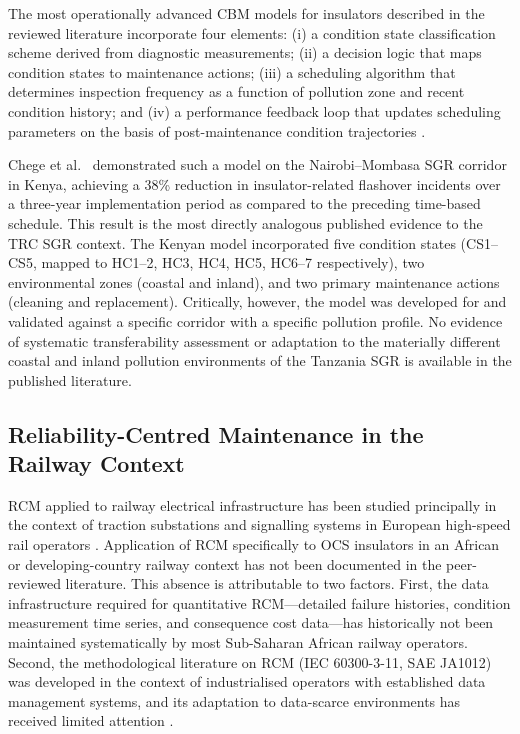 \documentclass[preprint,12pt,3p]{elsarticle}
\begin{document}
The most operationally advanced CBM models for insulators described
in the reviewed literature incorporate four elements: (i) a condition
state classification scheme derived from diagnostic measurements;
(ii) a decision logic that maps condition states to maintenance actions;
(iii) a scheduling algorithm that determines inspection frequency as a
function of pollution zone and recent condition history; and (iv)
a performance feedback loop that updates scheduling parameters on the
basis of post-maintenance condition trajectories \cite{Endrenyi2001,
Chege2019}.

Chege et al.\ \cite{Chege2019} demonstrated such a model on the
Nairobi--Mombasa SGR corridor in Kenya, achieving a 38\% reduction in
insulator-related flashover incidents over a three-year implementation
period as compared to the preceding time-based schedule. This result
is the most directly analogous published evidence to the TRC SGR
context. The Kenyan model incorporated five condition states
(CS1--CS5, mapped to HC1--2, HC3, HC4, HC5, HC6--7 respectively),
two environmental zones (coastal and inland), and two primary
maintenance actions (cleaning and replacement). Critically, however,
the model was developed for and validated against a specific corridor
with a specific pollution profile. No evidence of systematic
transferability assessment or adaptation to the materially different
coastal and inland pollution environments of the Tanzania SGR is
available in the published literature.

\subsection{Reliability-Centred Maintenance in the Railway Context}

RCM applied to railway electrical infrastructure has been studied
principally in the context of traction substations and signalling
systems in European high-speed rail operators \cite{Ciarapica2004}.
Application of RCM specifically to OCS insulators in an African or
developing-country railway context has not been documented in the
peer-reviewed literature. This absence is attributable to two factors.
First, the data infrastructure required for quantitative RCM---detailed
failure histories, condition measurement time series, and consequence
cost data---has historically not been maintained systematically by
most Sub-Saharan African railway operators. Second, the methodological
literature on RCM (IEC 60300-3-11, SAE JA1012) was developed in the
context of industrialised operators with established data management
systems, and its adaptation to data-scarce environments has received
limited attention \cite{Endrenyi2001}.
\end{document}
